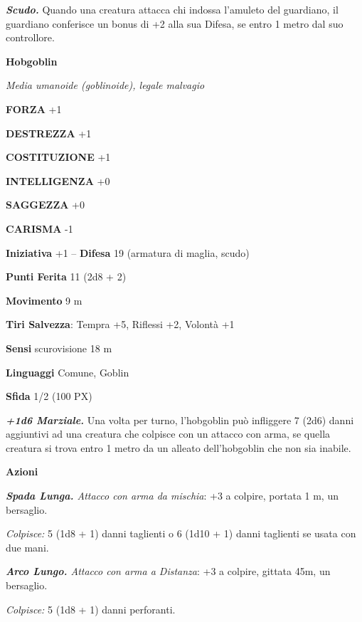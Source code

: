 \begin{multicols}{2}
	\textit{\textbf{Scudo.}} Quando una creatura attacca chi indossa l'amuleto del guardiano, il guardiano conferisce un bonus di +2 alla sua Difesa, se entro 1 metro dal suo controllore.

	\medskip{}\textbf{Hobgoblin}

	\textit{Media umanoide (goblinoide), legale malvagio}

	\textbf{FORZA} +1

	\textbf{DESTREZZA} +1

	\textbf{COSTITUZIONE} +1

	\textbf{INTELLIGENZA} +0

	\textbf{SAGGEZZA} +0

	\textbf{CARISMA} -1

	\textbf{Iniziativa} +1 -- \textbf{Difesa} 19 (armatura di maglia, scudo)

	\textbf{Punti Ferita} 11 (2d8 + 2)

	\textbf{Movimento} 9 m

	\textbf{Tiri Salvezza}: Tempra +5, Riflessi +2, Volontà +1

	\textbf{Sensi} scurovisione 18 m

	\textbf{Linguaggi} Comune, Goblin

	\textbf{Sfida} 1/2 (100 PX)

	\textit{\textbf{+1d6 Marziale.}} Una volta per turno, l'hobgoblin può infliggere 7 (2d6) danni aggiuntivi ad una creatura che colpisce con un attacco con arma, se quella creatura si trova entro 1 metro da un alleato dell'hobgoblin che non sia inabile.

	\textbf{Azioni}

	\textit{\textbf{Spada Lunga.} Attacco con arma da mischia}: +3 a colpire, portata 1 m, un bersaglio.

	\textit{Colpisce:} 5 (1d8 + 1) danni taglienti o 6 (1d10 + 1) danni taglienti se usata con due mani.

	\textit{\textbf{Arco Lungo.} Attacco con arma a Distanza}: +3 a colpire, gittata 45m, un bersaglio.

	\textit{Colpisce:} 5 (1d8 + 1) danni perforanti.


\end{multicols}
